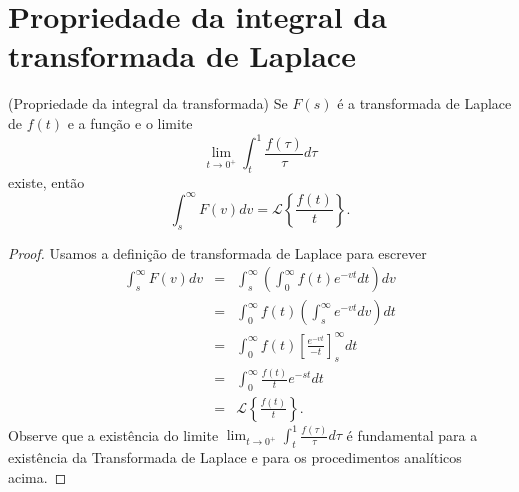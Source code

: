 \section{Propriedade da integral da transformada de Laplace}
\begin{teo}{\label{prop_int_transf}}(Propriedade da integral da transformada) Se $F(s)$ é a transformada de Laplace de $f(t)$ e a função
e o limite
\begin{equation}
\lim_{t\to 0^+}\int_{t}^1\frac{f(\tau)}{\tau}d\tau
\end{equation}
existe, então
\begin{equation}
\int_s^\infty F(v)dv =\mathcal{L}\left\{\frac{f(t)}{t}\right\}.
\end{equation}
 \end{teo}
\begin{proof} Usamos a definição de transformada de Laplace para escrever
\begin{eqnarray*}
\int_s^\infty F(v)dv&=&\int_s^\infty\left(\int_0^\infty f(t)e^{-vt}dt\right)dv\\
&=&\int_0^\infty f(t)\left(\int_s^\infty e^{-vt} dv \right)dt\\
&=&\int_0^\infty f(t)\left[\frac{ e^{-vt}}{-t} \right]_s^\infty dt\\
&=&\int_0^\infty \frac{f(t)}{t} e^{-st}  dt\\
&=&\mathcal{L}\left\{ \frac{f(t)}{t} \right\}.
\end{eqnarray*}
Observe que a existência do limite $\lim_{t\to 0^+}\int_{t}^1\frac{f(\tau)}{\tau}d\tau$ é fundamental para a existência da Transformada de Laplace e para os procedimentos analíticos acima.
\end{proof}
